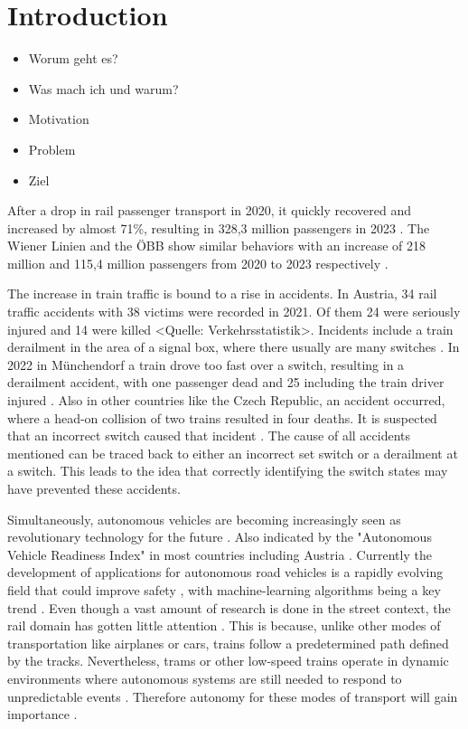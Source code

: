 \chapter{Introduction}
\label{sec:introduction}

\begin{itemize}
    \item Worum geht es?
    \item Was mach ich und warum?
    \item Motivation
    \item Problem
    \item Ziel
\end{itemize}


After a drop in rail passenger transport in 2020, it quickly recovered and increased by almost 71\%, resulting in 328,3 million passengers in 2023 \cite{schienenpersonenverkehrAustria}.
The Wiener Linien and the ÖBB show similar behaviors with an increase of 218 million and 115,4 million passengers from 2020 to 2023 respectively \cite{wienerLinienAustria} \cite{oebbAustria}.

The increase in train traffic is bound to a rise in accidents.
In Austria, 34 rail traffic accidents with 38 victims were recorded in 2021.
Of them 24 were seriously injured and 14 were killed <Quelle: Verkehrsstatistik>.
Incidents include a train derailment in the area of a signal box, where there usually are many switches \cite{zugEntgleist}.
In 2022 in Münchendorf a train drove too fast over a switch, resulting in a derailment accident, with one passenger dead and 25 including the train driver injured \cite{zugUnfall1Tod}.
Also in other countries like the Czech Republic, an accident occurred, where a head-on collision of two trains resulted in four deaths.
It is suspected that an incorrect switch caused that incident \cite{zugUnfallFrontal}.
The cause of all accidents mentioned can be traced back to either an incorrect set switch or a derailment at a switch.
This leads to the idea that correctly identifying the switch states may have prevented these accidents.

Simultaneously, autonomous vehicles are becoming increasingly seen as revolutionary technology for the future \cite{FraunhoferInstituteforCognitiveSystemsIKS}.
Also indicated by the "Autonomous Vehicle Readiness Index" \cite{autonomousVehicleReadinessIndex} in most countries including Austria \cite{autonomousVehicleReadinessCounties}.
Currently the development of applications for autonomous road vehicles is a rapidly evolving field that could improve safety \cite{railsem19dataset} \cite{tepNet2024}, with machine-learning algorithms being a key trend \cite{railsem19dataset}.
Even though a vast amount of research is done in the street context, the rail domain has gotten little attention \cite{railsem19dataset}.
This is because, unlike other modes of transportation like airplanes or cars, trains follow a predetermined path defined by the tracks.
Nevertheless, trams or other low-speed trains operate in dynamic environments where autonomous systems are still needed to respond to unpredictable events \cite{tepNet2024}.
Therefore autonomy for these modes of transport will gain importance \cite{railNet2019}.

